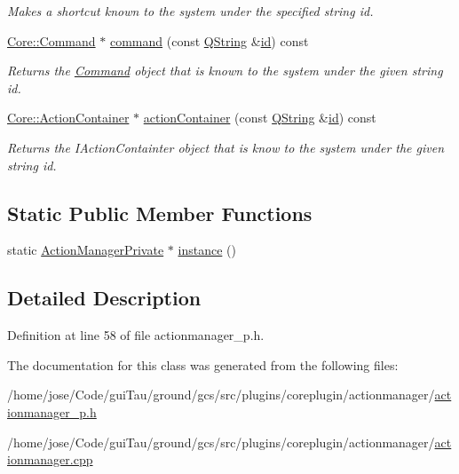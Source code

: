 \begin{DoxyCompactItemize}
\begin{DoxyCompactList}\small\item\em Makes a {\itshape shortcut} known to the system under the specified string {\itshape id}. \end{DoxyCompactList}\item 
\hyperlink{class_core_1_1_command}{Core\-::\-Command} $\ast$ \hyperlink{group___core_plugin_gacd785934e8130fefdd7b0c396d6f5ede}{command} (const \hyperlink{group___u_a_v_objects_plugin_gab9d252f49c333c94a72f97ce3105a32d}{Q\-String} \&\hyperlink{glext_8h_a58c2a664503e14ffb8f21012aabff3e9}{id}) const 
\begin{DoxyCompactList}\small\item\em Returns the \hyperlink{class_core_1_1_command}{Command} object that is known to the system under the given string {\itshape id}. \end{DoxyCompactList}\item 
\hyperlink{class_core_1_1_action_container}{Core\-::\-Action\-Container} $\ast$ \hyperlink{group___core_plugin_gae0f296ea10c2a2f3f8c4b9595c10e8d0}{action\-Container} (const \hyperlink{group___u_a_v_objects_plugin_gab9d252f49c333c94a72f97ce3105a32d}{Q\-String} \&\hyperlink{glext_8h_a58c2a664503e14ffb8f21012aabff3e9}{id}) const 
\begin{DoxyCompactList}\small\item\em Returns the I\-Action\-Containter object that is know to the system under the given string {\itshape id}. \end{DoxyCompactList}\end{DoxyCompactItemize}
\subsection*{Static Public Member Functions}
\begin{DoxyCompactItemize}
\item 
static \hyperlink{class_core_1_1_internal_1_1_action_manager_private}{Action\-Manager\-Private} $\ast$ \hyperlink{group___core_plugin_ga2faf640c44a7165ba476bf75170af584}{instance} ()
\end{DoxyCompactItemize}


\subsection{Detailed Description}


Definition at line 58 of file actionmanager\-\_\-p.\-h.



The documentation for this class was generated from the following files\-:\begin{DoxyCompactItemize}
\item 
/home/jose/\-Code/gui\-Tau/ground/gcs/src/plugins/coreplugin/actionmanager/\hyperlink{actionmanager__p_8h}{actionmanager\-\_\-p.\-h}\item 
/home/jose/\-Code/gui\-Tau/ground/gcs/src/plugins/coreplugin/actionmanager/\hyperlink{actionmanager_8cpp}{actionmanager.\-cpp}\end{DoxyCompactItemize}

